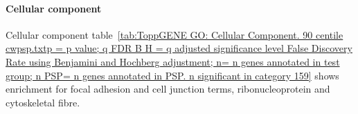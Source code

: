 \begin{table}[ht]
\label{tab:ToppGENE GO: Biological Process. 90 centile cwpsp.txtp = p value; q FDR B H = q adjusted significance level False Discovery Rate using Benjamini and Hochberg adjustment; n= n genes annotated in test group; n PSP= n genes annotated in PSP. n significant in category 1584}
\end{table}


\paragraph{Cellular component}


Cellular component table~\ref{tab:ToppGENE GO: Cellular Component. 90 centile cwpsp.txtp = p value; q FDR B H = q adjusted significance level False Discovery Rate using Benjamini and Hochberg adjustment; n= n genes annotated in test group; n PSP= n genes annotated in PSP. n significant in category 159} shows enrichment for focal adhesion and cell junction terms, ribonucleoprotein and cytoskeletal fibre. 


